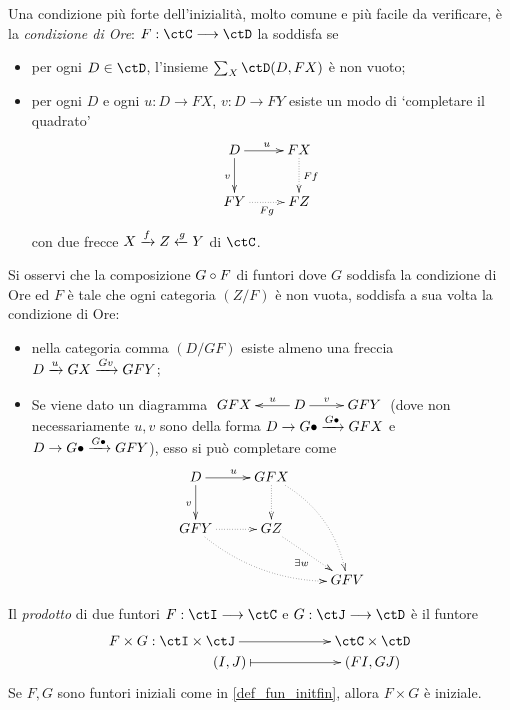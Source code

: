 \begin{remark}\label{condizione_ore}
	Una condizione più forte dell'inizialità, molto comune e più facile da verificare, è la \emph{condizione di Ore}: \(F : \ctC\fun\ctD\) la soddisfa se
	\begin{itemize}
		\item per ogni \(D\in\ctD\), l'insieme \(\sum_X\Hom\ctD(D,FX)\) è non vuoto;
		\item per ogni \(D\) e ogni \(u : D\to FX\), \(v : D\to FY\) esiste un modo di `completare il quadrato'
		      \[\xymatrix{
				      D\ar[r]^u\ar[d]_v & FX \ar@{.>}[d]^{Ff}\\
				      FY \ar@{.>}[r]_{Fg} & FZ
			      }\]
		      con due frecce \(X \xrightarrow{f}Z \xleftarrow{g} Y\) di \(\ctC\).
	\end{itemize}
\end{remark}
Si osservi che la composizione \(G\circ F\) di funtori dove \(G\) soddisfa la condizione di Ore ed \(F\) è tale che ogni categoria \((Z/F)\) è non vuota, soddisfa a sua volta la condizione di Ore:
\begin{itemize}
	\item nella categoria comma \((D/GF)\) esiste almeno una freccia \(D \xrightarrow{u} GX \xrightarrow{Gv} GFY\);
	\item Se viene dato un diagramma \(\xymatrix{GFX & \ar[l]_-u D\ar[r]^-v & GFY}\) (dove non necessariamente \(u,v\) sono della forma \(D\to G\bullet\xrightarrow{G\bullet}GFX\) e \(D\to G\bullet\xrightarrow{G\bullet}GFY\)), esso si può completare come
	      \[\xymatrix{
		      D \ar[r]^u\ar[d]_v& GFX\ar@{.>}[d]\ar@{.>}@/^1pc/[ddr]\\
		      GFY \ar@{.>}[r]\ar@{.>}@/_1pc/[drr] & GZ\ar@{.>}[dr]_{\exists w} \\
		      && GFV
		      }\]
\end{itemize}
\begin{theorem}\label{prod_inizi_iniziale}
	Il \emph{prodotto} di due funtori \(F : \ctI\fun\ctC\) e	\(G : \ctJ\fun\ctD\) è il funtore
	\[\xymatrix@R=0cm{
		**[l] F\times G : 	\ctI\times\ctJ \ar[r] & \ctC\times\ctD \\
		(I,J) \ar@{|->}[r] & (FI,GJ)
		}\]
	Se \(F,G\) sono funtori iniziali come in \ref{def_fun_initfin}, allora \(F\times G\) è iniziale.
\end{theorem}
